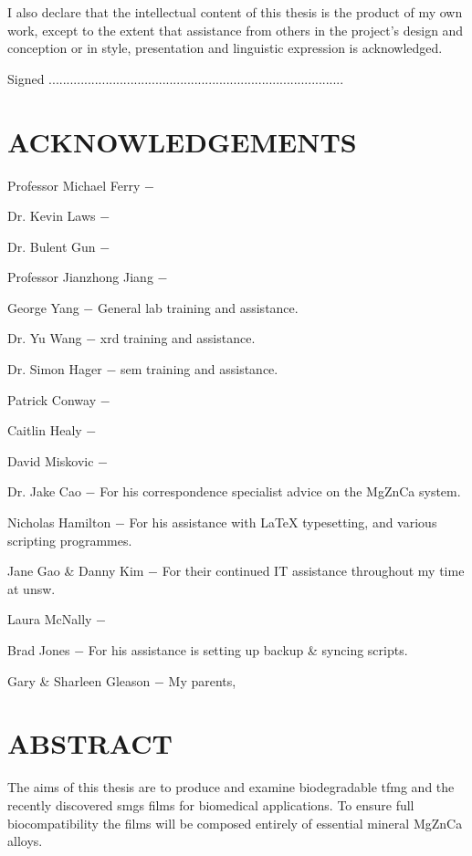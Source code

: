 \documentclass[a4paper,12pt,oneside]{report}%
\begin{document}
I also declare that the intellectual content of this thesis is the product of my own work,
except to the extent that assistance from others in the project’s design and conception
or in style, presentation and linguistic expression is acknowledged.

\vspace{2cm}

Signed ...................................................................................


\chapter*{ACKNOWLEDGEMENTS}

Professor Michael Ferry $-$ 

Dr. Kevin Laws $-$ 

Dr. Bulent Gun $-$ 

Professor Jianzhong Jiang $-$

George Yang $-$ General lab training and assistance.

Dr. Yu Wang $-$ \acrshort{xrd} training and assistance.

Dr. Simon Hager $-$ \acrshort{sem} training and assistance.

Patrick Conway $-$ 

Caitlin Healy $-$ 

David Miskovic $-$ 

Dr. Jake Cao $-$ For his correspondence specialist advice on the MgZnCa system.

Nicholas Hamilton $-$ For his assistance with \LaTeX{} typesetting, and various scripting programmes.

Jane Gao \& Danny Kim $-$ For their continued IT assistance throughout my time at \acrshort{unsw}.

Laura McNally $-$

Brad Jones $-$ For his assistance is setting up backup \& syncing scripts.

Gary \& Sharleen Gleason $-$ My parents, 

\chapter*{ABSTRACT}

The aims of this thesis are to produce and examine biodegradable \gls{tfmg} and the recently discovered \glspl{smg} films for biomedical applications. To ensure full biocompatibility the films will be composed entirely of essential mineral MgZnCa alloys.
\end{document}
